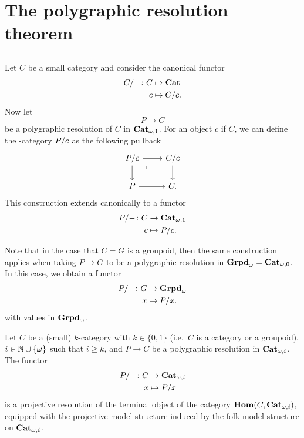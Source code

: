 \section{The polygraphic resolution theorem}

\subsection{}
\begin{paragr}
  Let $C$ be a small category and consider the canonical functor
  \[
    \begin{aligned}
      C/- \colon C &\mapsto \mathbf{Cat} \\
      c &\mapsto C/c.
    \end{aligned}
  \]
  Now let
  \[
    P \to C
  \]
  be a polygraphic resolution of $C$ in $\mathbf{Cat}_{\omega,1}$. For an object $c$
  if $C$, we can define the \nbd-category $P/c$
  as the following pullback
  \[
    \begin{tikzcd}
      \tr{P}{c} \ar[d] \ar[r] & \tr{C}{c} \ar[d] \\
      P \ar[r] & C.
      \ar[from=1-1,to=2-2,phantom,"\lrcorner",very near start]
    \end{tikzcd}
  \]
  This construction extends canonically to a functor
  \[
    \begin{aligned}
      P/- \colon C &\to \mathbf{Cat}_{\omega,1} \\
      c &\mapsto P/c.
    \end{aligned}
  \]


  Note that in the case that $C=G$ is a groupoid, then the same
  construction applies when taking $P \to G$ to be a polygraphic
  resolution in $\mathbf{Grpd}_{\omega}=\mathbf{Cat}_{\omega,0}$. In this case, we obtain a functor
  \[
       \begin{aligned}
      P/- \colon G &\to \mathbf{Grpd}_{\omega} \\
      x &\mapsto P/x.
    \end{aligned} 
  \]
  with values in $\mathbf{Grpd}_{\omega}$.
\end{paragr}
\begin{theorem}
  Let $C$ be a (small) $k$\nbd-category with $k \in \{0,1\}$ (i.e.\
  $C$ is a category or a groupoid),  $i \in \mathbb N\cup\{\omega\}$ such that
  $i \geq k$, and $P \to C$ be a polygraphic
  resolution in $\mathbf{Cat}_{\omega,i}$. The functor
    \[
    \begin{aligned}
      P/- \colon C &\to  \mathbf{Cat}_{\omega,i}\\
      x &\mapsto P/x
    \end{aligned}
  \]
  is a projective resolution of the terminal object of the category
  $\mathbf{Hom}(C,\mathbf{Cat}_{\omega,i})$, equipped with the projective model structure
  induced by the folk model structure on $\mathbf{Cat}_{\omega,i}$.
\end{theorem}

